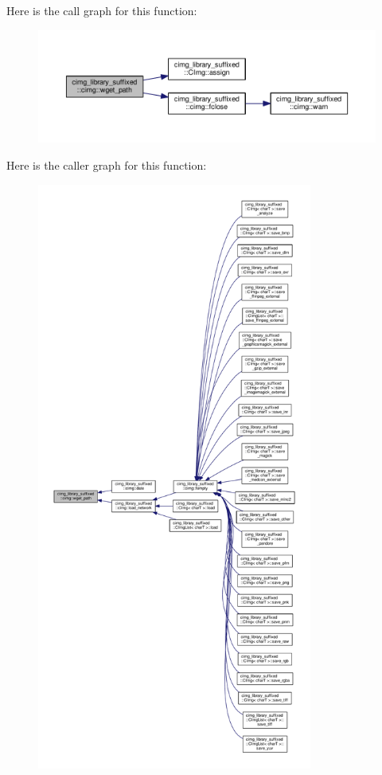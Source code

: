 Here is the call graph for this function\+:
\nopagebreak
\begin{figure}[H]
\begin{center}
\leavevmode
\includegraphics[width=350pt]{d4/d9b/namespacecimg__library__suffixed_1_1cimg_a36ccf2e6a6542f4e93eac819cf5d91ba_cgraph}
\end{center}
\end{figure}
Here is the caller graph for this function\+:
\nopagebreak
\begin{figure}[H]
\begin{center}
\leavevmode
\includegraphics[height=550pt]{d4/d9b/namespacecimg__library__suffixed_1_1cimg_a36ccf2e6a6542f4e93eac819cf5d91ba_icgraph}
\end{center}
\end{figure}


